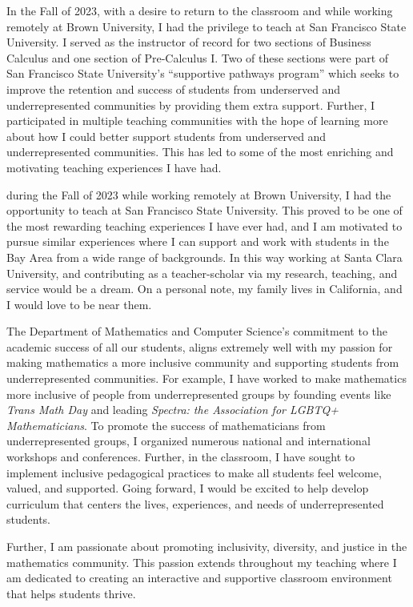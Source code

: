 \documentclass[11pt]{article}
\begin{document}
In the Fall of 2023, with a desire to return to the classroom and while working remotely at Brown University, I had the privilege to teach at San Francisco State University. I served as the instructor of record for two sections of Business Calculus and one section of Pre-Calculus I. Two of these sections were part of San Francisco State University's  ``supportive pathways program'' which seeks to improve the retention and success of students from underserved and underrepresented communities by providing them extra support. Further,  I participated in multiple teaching communities with the hope of learning more about how I could better support students from underserved and underrepresented communities. This has led to some of the most enriching and motivating teaching experiences I have had. 


 during the Fall of 2023 while working remotely at Brown University, I had the opportunity to teach at San Francisco State University. This proved to be one of the most rewarding teaching experiences I have ever had, and I am motivated to pursue similar experiences where I can support and work with students in the Bay Area from a wide range of backgrounds. In this way working at Santa Clara University, and contributing as a teacher-scholar via my research, teaching, and service would be a dream. On a personal note, my family lives in California, and I would love to be near them. 

The Department of Mathematics and Computer Science's commitment to the academic success of all our students, aligns extremely well with my passion for making mathematics a more inclusive community and supporting students from underrepresented communities. For example, I have worked to make mathematics more inclusive of people from underrepresented groups by founding events like \textit{Trans Math Day} and leading \textit{Spectra: the Association for LGBTQ+ Mathematicians}. To promote the success of mathematicians from underrepresented groups, I organized numerous national and international workshops and conferences. Further, in the classroom, I have sought to implement inclusive pedagogical practices to make all students feel welcome, valued, and supported. Going forward, I would be excited to help develop curriculum that centers the lives, experiences, and needs of underrepresented students. 

Further, I am passionate about promoting inclusivity, diversity, and justice in the mathematics community. This passion extends throughout my teaching where I am dedicated to creating an interactive and supportive classroom environment that helps students thrive. 
\end{document}

